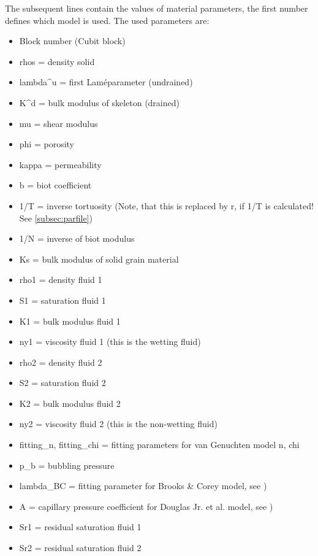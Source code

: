 		    
		    The subsequent lines contain the values of material parameters, the first number defines which model is used. The used parameters are: 
		    \begin{itemize}
		    \item Block number (Cubit block)
		    \item rhos = density solid
		    \item lambda\^{}u = first Laméparameter (undrained)
		    \item K\^{}d = bulk modulus of skeleton (drained)
		    \item mu = shear modulus
		    \item phi = porosity
		    \item kappa = permeability
		    \item b = biot coefficient
		    \item 1/T = inverse tortuosity (Note, that this is replaced by r, if 1/T is calculated! See \ref{subsec:parfile})
		    \item 1/N = inverse of biot modulus
		    \item Ks = bulk modulus of solid grain material
		    \item rho1 = density fluid 1
		    \item S1 = saturation fluid 1
		    \item K1 = bulk modulus fluid 1
		    \item ny1 = viscosity fluid 1 (this is the wetting fluid)
		    \item rho2 = density fluid 2
		    \item S2 = saturation fluid 2
		    \item K2 = bulk modulus fluid 2
		    \item ny2 = viscosity fluid 2 (this is the non-wetting fluid)
		    \item fitting\_n, fitting\_chi = fitting parameters for van Genuchten model n, chi \citep[see][]{Boxberg.2019}
		    \item p\_b = bubbling pressure
		    \item lambda\_BC = fitting parameter for Brooks \& Corey model, see \citep{Boxberg.2019})
		    \item A = capillary pressure coefficient for Douglas Jr. et al. model, see \citep{Boxberg.2019})
		    \item Sr1 = residual saturation fluid 1
		    \item Sr2 = residual saturation fluid 2
		    \end{itemize} 
